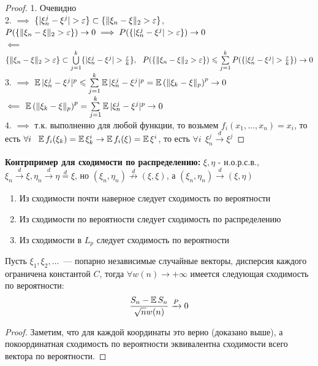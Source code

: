 \begin{proof}
1. Очевидно \\
2. $\implies$ $\{ |\xi_n^j - \xi^j| > \varepsilon\} \subset \{ \|\xi_n - \xi\|_2 > \varepsilon\}$, \ \  $P(\{ \|\xi_n - \xi\|_2 > \varepsilon\}) \to 0 \implies P(\{ |\xi_n^j - \xi^j| > \varepsilon\}) \to 0$\\
$\impliedby$ $\{ \|\xi_n - \xi\|_2 > \eps\} \subset \bigcup\limits_{j = 1}^k \{ |\xi_n^j - \xi^j| > \frac{\eps}{k}\}, \ \ P(\{ \|\xi_n - \xi\|_2 > \eps\}) \leqslant \sum\limits_{j = 1}^k P(\{ |\xi_n^j - \xi^j| > \frac{\eps}{k}\}) \to 0$\\
3. $\implies$ $\operatorname{\mathbb{E}}|\xi_n^j - \xi^j|^p \leqslant  \sum\limits_{j = 1}^k \operatorname{\mathbb{E}}|\xi_n^j - \xi^j|^p = \operatorname{\mathbb{E}}\left({\|\xi_k - \xi\|_p}\right)^p \to 0 $ \\
$\impliedby$ $\operatorname{\mathbb{E}}\left({\|\xi_k - \xi\|_p}\right)^p = \sum\limits_{j = 1}^k \operatorname{\mathbb{E}}|\xi_n^j - \xi^j|^p \to 0$\\
4. $\implies$ т.к. выполненно для любой функции, то возьмем $f_i(x_1, \ldots, x_n) = x_i$, то есть $\forall i \ \ \operatorname{\mathbb{E}} f_i(\xi_k) = \operatorname{\mathbb{E}} \xi_k^i \to \operatorname{\mathbb{E}} f_i(\xi) = \operatorname{\mathbb{E}} \xi^i$, то есть $\forall i \ \ \xi_n^j \xrightarrow[]{d} \xi^j$
\end{proof}

\textbf{Контрпример для сходимости по распределению:} $\xi, \eta$ - н.о.р.с.в., $\xi_n \xrightarrow[]{d} \xi, \eta_n \xrightarrow[]{d} \eta \stackrel{d}{=} \xi$, но $(\xi_n, \eta_n) \stackrel{d}{\nrightarrow} (\xi, \xi)$, а $(\xi_n, \eta_n) \xrightarrow[]{d} (\xi, \eta)$

\begin{theorem}
\begin{enumerate}
    \item Из сходимости почти наверное следует сходимость по вероятности
    \item Из сходимости по вероятности следует сходимость по распределению
    \item Из сходимости в $L_p$ следует сходимость по вероятности
\end{enumerate}
\end{theorem}


\begin{theorem}
Пусть $\xi_1, \xi_2, \ldots$~--- попарно независимые случайные векторы, дисперсия каждого ограничена константой $C$, тогда $\forall w(n) \to +\infty$ имеется следующая сходимость по вероятности:
$$
\frac{S_n - \operatorname{\mathbb{E}} S_n}{\sqrt{n}w(n)} \xrightarrow[]{P} 0
$$
\end{theorem}

\begin{proof} Заметим, что для каждой координаты это верно (доказано выше), а покоординатная сходимость по вероятности эквивалентна сходимости всего вектора по вероятности. \end{proof}


